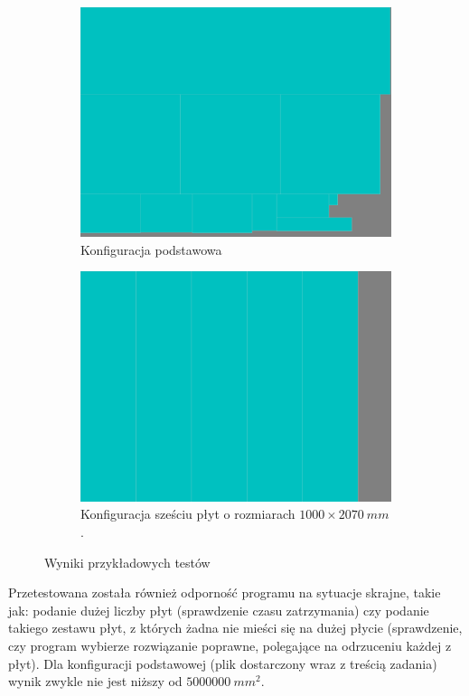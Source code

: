 \documentclass[11pt,a4paper,oneside]{article}
\begin{document}
\begin{figure}[H]
\begin{subfigure}{.49\textwidth}
    \centering
    \includegraphics[width=.95\linewidth]{res/result1.pdf}
    \caption{Konfiguracja podstawowa}
\end{subfigure}
\hfill
\begin{subfigure}{.49\textwidth}
    \centering
    \includegraphics[width=.95\linewidth]{res/result2.pdf}
    \caption{Konfiguracja sześciu płyt o rozmiarach $1000 \times 2070~\si{mm}$.}
\end{subfigure}
\caption{Wyniki przykładowych testów}
\label{fig:fig3}
\end{figure}

Przetestowana została również odporność programu na sytuacje skrajne, takie jak: podanie dużej liczby płyt (sprawdzenie czasu zatrzymania) czy podanie takiego zestawu płyt, z których żadna nie mieści się na dużej płycie (sprawdzenie, czy program wybierze rozwiązanie poprawne, polegające na odrzuceniu każdej z płyt). Dla konfiguracji podstawowej (plik dostarczony wraz z treścią zadania) wynik zwykle nie jest niższy od $5000000~\si{mm^2}$.
\end{document}

